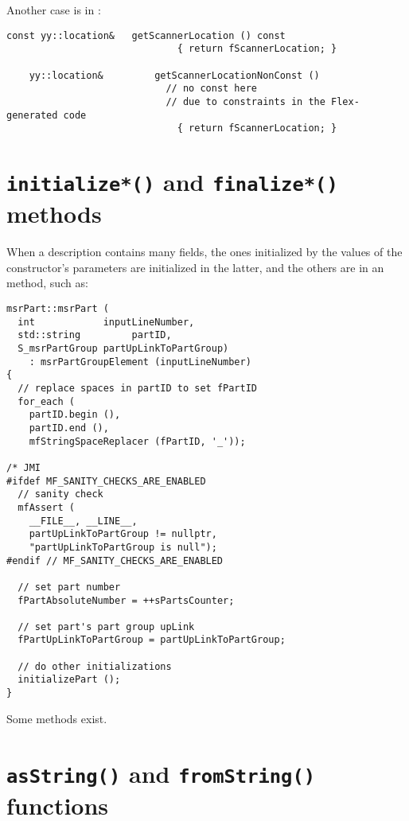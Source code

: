 Another case is in :
\begin{lstlisting}[language=CPlusPlus]
    const yy::location&   getScannerLocation () const
                              { return fScannerLocation; }

    yy::location&         getScannerLocationNonConst ()
                            // no const here
                            // due to constraints in the Flex-generated code
                              { return fScannerLocation; }
\end{lstlisting}


\section{{\tt initialize*()} and {\tt finalize*()} methods}

When a description contains many fields, the ones initialized by the values of the constructor's parameters are initialized in the latter, and the others are in an  method, such as:
\begin{lstlisting}[language=CPlusPlus]
msrPart::msrPart (
  int            inputLineNumber,
  std::string         partID,
  S_msrPartGroup partUpLinkToPartGroup)
    : msrPartGroupElement (inputLineNumber)
{
  // replace spaces in partID to set fPartID
  for_each (
    partID.begin (),
    partID.end (),
    mfStringSpaceReplacer (fPartID, '_'));

/* JMI
#ifdef MF_SANITY_CHECKS_ARE_ENABLED
  // sanity check
  mfAssert (
    __FILE__, __LINE__,
    partUpLinkToPartGroup != nullptr,
    "partUpLinkToPartGroup is null");
#endif // MF_SANITY_CHECKS_ARE_ENABLED

  // set part number
  fPartAbsoluteNumber = ++sPartsCounter;

  // set part's part group upLink
  fPartUpLinkToPartGroup = partUpLinkToPartGroup;

  // do other initializations
  initializePart ();
}
\end{lstlisting}

Some  methods exist. %


\section{{\tt *asString()} and {\tt *fromString()} functions}

